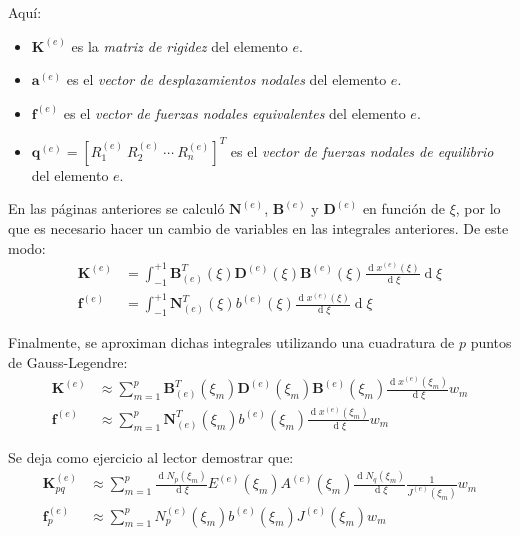 \documentclass[12pt,letterpaper]{article}
\newcommand{\ve}[1]{{\boldsymbol{#1}}}
\newcommand{\ma}[1]{{\boldsymbol{#1}}}
\newcommand{\dd}{\operatorname{d} \!}
\begin{document}
Aquí:
\begin{itemize}
    \item $\ma{K}^{(e)}$ es la \emph{matriz de rigidez} del elemento $e$.
    \item $\ve{a}^{(e)}$ es el \emph{vector de desplazamientos nodales} del elemento $e$.
    \item $\ma{f}^{(e)}$ es el \emph{vector de fuerzas nodales equivalentes} del elemento $e$.    
    \item $\ve{q}^{(e)} = [R_1^{(e)}\ R_2^{(e)}\ \cdots \ R_n^{(e)}]^T$ es el \emph{vector de fuerzas nodales de equilibrio} del elemento $e$.
\end{itemize}

En las páginas anteriores se calculó $\ma{N}^{(e)}$, $\ma{B}^{(e)}$ y $\ma{D}^{(e)}$ en función de $\xi$, por lo que es necesario hacer un cambio de variables en las integrales anteriores. De este modo:
\begin{align}
\ma{K}^{(e)} &= \int_{-1}^{+1} \ma{B}_{(e)}^T(\xi) \ma{D}^{(e)}(\xi) \ma{B}^{(e)}(\xi) \frac{\dd x^{(e)}(\xi)}{\dd \xi} \dd \xi\\
\ma{f}^{(e)} &= \int_{-1}^{+1}  \ma{N}_{(e)}^T(\xi) b^{(e)}(\xi) \frac{\dd x^{(e)}(\xi)}{\dd \xi} \dd \xi
\end{align}

Finalmente, se aproximan dichas integrales utilizando una cuadratura de $p$ puntos de Gauss-Legendre:
\begin{align}
\ma{K}^{(e)} &\approx \sum_{m=1}^p \ma{B}_{(e)}^T(\xi_m) \ma{D}^{(e)}(\xi_m) \ma{B}^{(e)}(\xi_m) \frac{\dd x^{(e)}(\xi_m)}{\dd \xi} w_m\\
\ma{f}^{(e)} &\approx \sum_{m=1}^p  \ma{N}_{(e)}^T(\xi_m) b^{(e)}(\xi_m) \frac{\dd x^{(e)}(\xi_m)}{\dd \xi} w_m
\end{align}

Se deja como ejercicio al lector demostrar que:
\begin{align}
\ma{K}^{(e)}_{pq} &\approx \sum_{m=1}^p \frac{\dd N_p(\xi_m)}{\dd \xi} E^{(e)}(\xi_m) A^{(e)}(\xi_m) \frac{\dd N_q(\xi_m)}{\dd \xi} \frac{1}{J^{(e)}(\xi_m)} w_m\\
\ma{f}^{(e)}_p &\approx \sum_{m=1}^p  N_p^{(e)}(\xi_m) b^{(e)}(\xi_m) J^{(e)}(\xi_m) w_m
\end{align}
\end{document}
